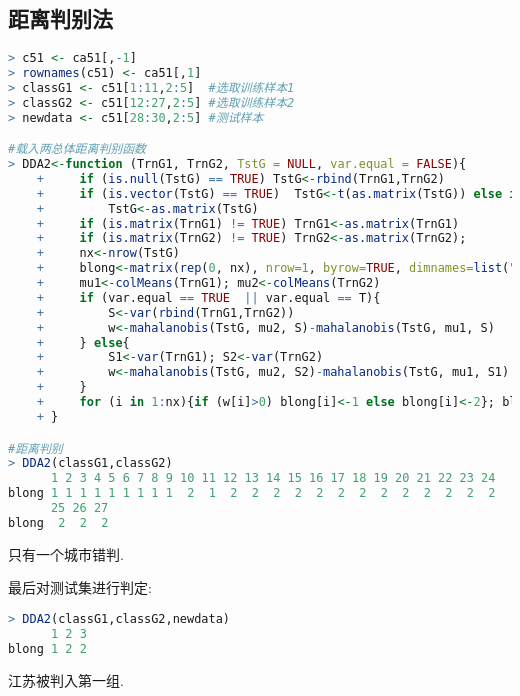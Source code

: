 \documentclass[11pt,a4paper,oneside]{book}
\begin{document}
\subsection{距离判别法}
\begin{lstlisting}[language=r]
> c51 <- ca51[,-1]
> rownames(c51) <- ca51[,1]
> classG1 <- c51[1:11,2:5]  #选取训练样本1
> classG2 <- c51[12:27,2:5] #选取训练样本2
> newdata <- c51[28:30,2:5] #测试样本

#载入两总体距离判别函数
> DDA2<-function (TrnG1, TrnG2, TstG = NULL, var.equal = FALSE){
	+     if (is.null(TstG) == TRUE) TstG<-rbind(TrnG1,TrnG2)
	+     if (is.vector(TstG) == TRUE)  TstG<-t(as.matrix(TstG)) else if (is.matrix(TstG) != TRUE)
	+         TstG<-as.matrix(TstG)
	+     if (is.matrix(TrnG1) != TRUE) TrnG1<-as.matrix(TrnG1)
	+     if (is.matrix(TrnG2) != TRUE) TrnG2<-as.matrix(TrnG2); 
	+     nx<-nrow(TstG)
	+     blong<-matrix(rep(0, nx), nrow=1, byrow=TRUE, dimnames=list("blong", 1:nx))
	+     mu1<-colMeans(TrnG1); mu2<-colMeans(TrnG2) 
	+     if (var.equal == TRUE  || var.equal == T){
	+         S<-var(rbind(TrnG1,TrnG2))
	+         w<-mahalanobis(TstG, mu2, S)-mahalanobis(TstG, mu1, S)
	+     } else{
	+         S1<-var(TrnG1); S2<-var(TrnG2)
	+         w<-mahalanobis(TstG, mu2, S2)-mahalanobis(TstG, mu1, S1)
	+     }
	+     for (i in 1:nx){if (w[i]>0) blong[i]<-1 else blong[i]<-2}; blong
	+ }

#距离判别
> DDA2(classG1,classG2)
      1 2 3 4 5 6 7 8 9 10 11 12 13 14 15 16 17 18 19 20 21 22 23 24
blong 1 1 1 1 1 1 1 1 1  2  1  2  2  2  2  2  2  2  2  2  2  2  2  2
      25 26 27
blong  2  2  2
\end{lstlisting}
只有一个城市错判.

最后对测试集进行判定:
\begin{lstlisting}[language=r]
> DDA2(classG1,classG2,newdata)
      1 2 3
blong 1 2 2
\end{lstlisting}
江苏被判入第一组.
\end{document}
